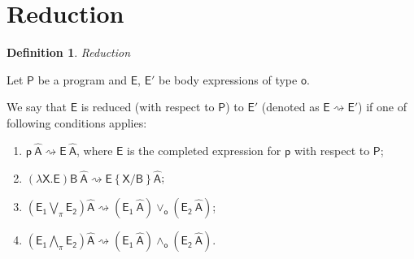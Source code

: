 \documentclass[inscr,ack,preface]{dithesis}
\theoremstyle{definition}
\newtheorem{definition}{Definition}[]
\newcommand{\msf}[1]{$\mathsf{#1}$}
\begin{document}
\section{Reduction}
\begin{definition}{\emph{Reduction}}

Let \msf{P} be a program and \msf{E}, \msf{E'} be body expressions of type \msf{o}.

We say that \msf{E} is reduced (with respect to \msf{P}) to \msf{E'} (denoted as \msf{E \rightsquigarrow E'}) if one of following conditions applies:

\begin{enumerate}
  \item \msf{p ~ \widehat{A} \rightsquigarrow E ~ \widehat{A}}, where \msf{E} is the completed expression for \msf{p} with respect to \msf{P};
  \item \msf{\left( \lambda X. E \right) B ~ \widehat{A} \rightsquigarrow E\left\{ X / B \right\} \widehat{A}};
  \item \msf{\left( E_1 \bigvee_{\pi} E_2 \right) \widehat{A} \rightsquigarrow \left( E_1 ~ \widehat{A} \right) \lor_{o} \left( E_2 ~ \widehat{A}  \right)};
  \item \msf{\left( E_1 \bigwedge_{\pi} E_2 \right) \widehat{A} \rightsquigarrow \left( E_1 ~ \widehat{A} \right) \land_{o} \left( E_2 ~ \widehat{A}  \right)}.
\end{enumerate}

\end{definition}
\end{document}
